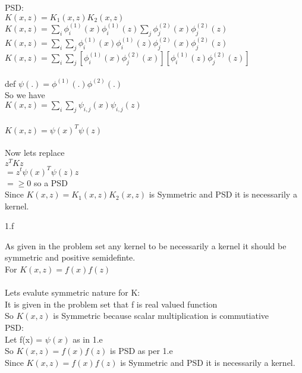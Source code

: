   PSD: \\
  $K(x,z) =K_1(x,z)K_2(x,z) $ \\
  $K(x,z) = \displaystyle \sum_i \phi_{i}^{(1)}(x) \phi_{i}^{(1)}(z) \displaystyle \sum_j \phi_{j}^{(2)}(x) \phi_{j}^{(2)}(z) $\\
  $K(x,z) = \displaystyle \sum_i  \displaystyle \sum_j \phi_{i}^{(1)}(x) \phi_{i}^{(1)}(z) \phi_{j}^{(2)}(x) \phi_{j}^{(2)}(z) $\\
  $K(x,z) = \displaystyle \sum_i  \displaystyle \sum_j [\phi_{i}^{(1)}(x) \phi_{j}^{(2)}(x)] [\phi_{i}^{(1)}(z) \phi_{j}^{(2)}(z)] $\\ \\
 def $\psi(.) =  \phi^{(1)}(.) \phi^{(2)}(.)$ \\  So we have \\
 
 $K(x,z) = \displaystyle \sum_i  \displaystyle \sum_j \psi_{i,j}(x) \psi_{i,j}(z) $\\ \\
 $K(x,z) = \psi(x)^{T} \psi(z) $\\ \\
 Now lets replace \\
 $z^TKz $\\ $=  z^t \psi(x)^{T} \psi(z)z$ \\
 $ =  \geq 0 $ so a PSD \\
 Since  $K(x,z) =K_1(x,z)K_2(x,z) $ is Symmetric and PSD it is necessarily a kernel.
\clearpage

\LARGE
1.f
\normalsize

    As given in the problem set any kernel to be necessarily a kernel it should be symmetric and positive semidefinte.\\
  For $K(x,z) =f(x)f(z) $ \\ \\
  Lets evalute symmetric nature for K: \\
  It is given in the problem set that f is real valued function \\ 
  So $K(x,z)$ is Symmetric because scalar multiplication is commutiative \\
  
  PSD: \\
  Let f(x) = $ \psi (x)$ as in 1.e \\
  So $K(x,z) =f(x)f(z)$ is PSD as per 1.e  \\

  Since $K(x,z) =f(x)f(z) $ is Symmetric and PSD it is necessarily a kernel.

